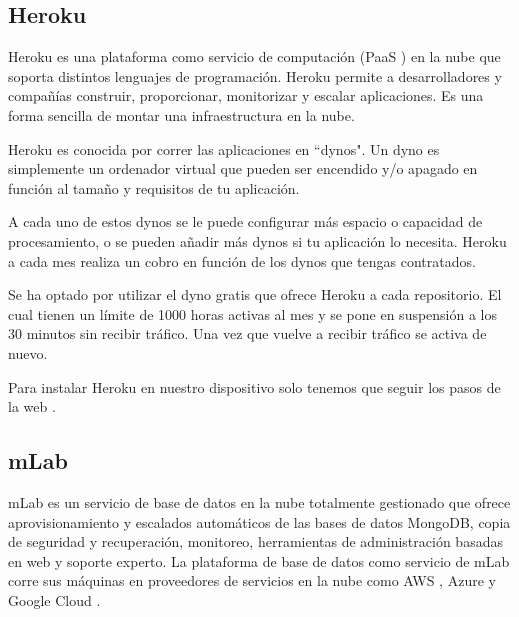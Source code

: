 

\subsection{ Heroku }

Heroku es una plataforma como servicio de computación (PaaS \cite{URL::PaaS}) en la nube que soporta distintos lenguajes de programación. Heroku permite a desarrolladores y compañías construir, proporcionar, monitorizar y escalar aplicaciones. Es una forma sencilla de montar una infraestructura en la nube.

Heroku es conocida por correr las aplicaciones en ``dynos". Un dyno es simplemente un ordenador virtual que pueden ser encendido y/o apagado en función al tamaño y requisitos de tu aplicación.

A cada uno de estos dynos se le puede configurar más espacio o capacidad de procesamiento, o se pueden añadir más dynos si tu aplicación lo necesita. Heroku a cada mes realiza un cobro en función de los dynos que tengas contratados. 

Se ha optado por utilizar el dyno gratis que ofrece Heroku a cada repositorio. El cual tienen un límite de 1000 horas activas al mes y se pone en suspensión a los 30 minutos sin recibir tráfico. Una vez que vuelve a recibir tráfico se activa de nuevo.    

Para instalar Heroku en nuestro dispositivo solo tenemos que seguir los pasos de la web \cite{URL::HerokuCLI}.


\subsection{ mLab }

mLab es un servicio de base de datos en la nube totalmente gestionado que ofrece aprovisionamiento y escalados automáticos de las bases de datos MongoDB, copia de seguridad y recuperación, monitoreo, herramientas de administración basadas en web y soporte experto. La plataforma de base de datos como servicio de mLab corre sus máquinas en proveedores de servicios en la nube como AWS \cite{URL::aws}, Azure \cite{URL::Azure} y Google Cloud \cite{URL::GoogleCloud}.

